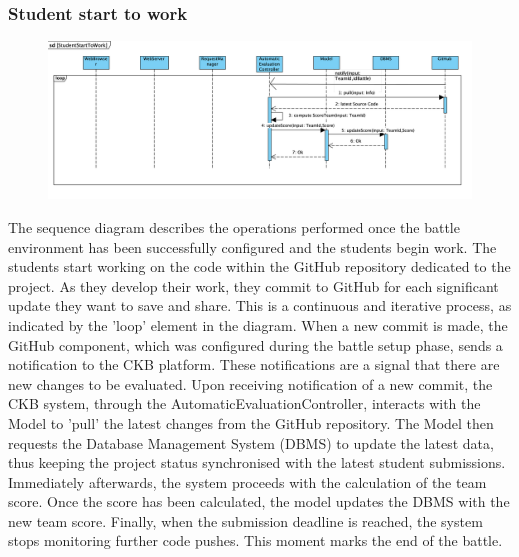 \subsubsection{Student start to work}
\begin{figure}[H]
    \centering
    \includegraphics[width=1\textwidth]{SequenceDiagram/StudentStartToWork.png}
    \label{fig:enter-label}
\end{figure}
The sequence diagram describes the operations performed once the battle environment has been successfully configured and the students begin work.
The students start working on the code within the GitHub repository dedicated to the project. As they develop their work, they commit to GitHub for each significant update they want to save and share. This is a continuous and iterative process, as indicated by the 'loop' element in the diagram.
When a new commit is made, the GitHub component, which was configured during the battle setup phase, sends a notification to the CKB platform. These notifications are a signal that there are new changes to be evaluated.
Upon receiving notification of a new commit, the CKB system, through the AutomaticEvaluationController, interacts with the Model to 'pull' the latest changes from the GitHub repository. The Model then requests the Database Management System (DBMS) to update the latest data, thus keeping the project status synchronised with the latest student submissions.
Immediately afterwards, the system proceeds with the calculation of the team score. Once the score has been calculated, the model updates the DBMS with the new team score.
Finally, when the submission deadline is reached, the system stops monitoring further code pushes. This moment marks the end of the battle.




